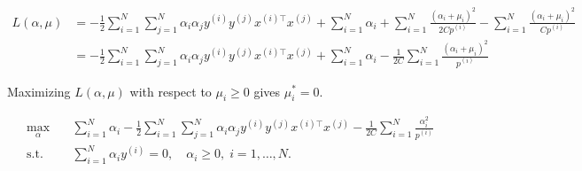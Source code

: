 \documentclass{article}
\theoremstyle{definition}
\theoremstyle{remark}
\begin{document}
\begin{enumerate}[font={\Large\bfseries},left=0pt]
\begin{tcolorbox}
\begin{enumerate}
\begin{enumerate}
				            \begin{align}
					            L(\alpha, \mu)
					             & = -\frac{1}{2} \sum_{i=1}^N \sum_{j=1}^N
					            \alpha_i \alpha_j y^{(i)} y^{(j)} x^{(i)\top} x^{(j)}
					            + \sum_{i=1}^N \alpha_i
					            + \sum_{i=1}^N \frac{(\alpha_i + \mu_i)^2}{2Cp^{(i)}} - \sum^{N}_{i = 1} \frac{(\alpha_i + \mu_i)^2}{Cp^{(i)}} \\
					             & = -\frac{1}{2} \sum_{i=1}^N \sum_{j=1}^N
					            \alpha_i \alpha_j y^{(i)} y^{(j)} x^{(i)\top} x^{(j)}
					            + \sum_{i=1}^N \alpha_i
					            - \frac{1}{2C}\sum_{i=1}^N \frac{(\alpha_i + \mu_i)^2}{p^{(i)}}
				            \end{align}

				            Maximizing $L(\alpha, \mu)$ with respect to $\mu_i \ge 0$ gives $\mu_i^* = 0$.

				            \begin{align}
					            \max_{\alpha} \quad &
					            \sum_{i=1}^N \alpha_i
					            - \frac{1}{2} \sum_{i=1}^N \sum_{j=1}^N
					            \alpha_i \alpha_j y^{(i)} y^{(j)} x^{(i)\top} x^{(j)}
					            - \frac{1}{2C}\sum_{i=1}^N \frac{\alpha_i^2}{p^{(i)}} \\
					            \text{s.t.} \quad   &
					            \sum_{i=1}^N \alpha_i y^{(i)} = 0, \quad
					            \alpha_i \ge 0, \; i = 1, \dots, N.
				            \end{align}


			      \end{enumerate}
		\end{enumerate}

	\end{tcolorbox}


\end{enumerate}
\end{document}
